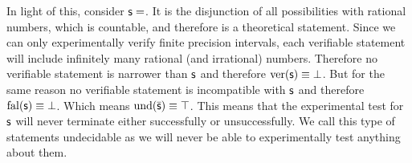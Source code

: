 \documentclass[11pt,letterpaper,fleqn]{memoir} %
\begin{document}
In light of this, consider $\mathsf{s}=$. It is the disjunction of all possibilities with rational numbers, which is countable, and therefore is a theoretical statement. Since we can only experimentally verify finite precision intervals, each verifiable statement will include infinitely many rational (and irrational) numbers. Therefore no verifiable statement is narrower than $\mathsf{s}$ and therefore $\operatorname{ver}(\mathsf{s}) \equiv \bot$. But for the same reason no verifiable statement is incompatible with  $\mathsf{s}$ and therefore $\operatorname{fal}(\mathsf{s}) \equiv \bot$. Which means $\operatorname{und}(\bar{\mathsf{s}}) \equiv \top$. This means that the experimental test for $\mathsf{s}$ will never terminate either successfully or unsuccessfully. We call this type of statements undecidable as we will never be able to experimentally test anything about them.
\end{document}
